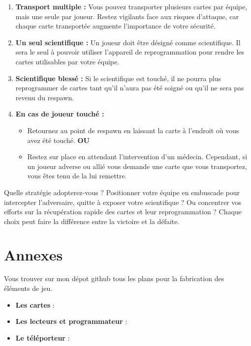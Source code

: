 \documentclass{template}
\begin{document}
\begin{enumerate}
    \item \textbf{Transport multiple :} Vous pouvez transporter plusieurs cartes par équipe, mais une seule par joueur. Restez vigilants face aux risques d’attaque, car chaque carte transportée augmente l’importance de votre sécurité.
    \item \textbf{Un seul scientifique :} Un joueur doit être désigné comme scientifique. Il sera le seul à pouvoir utiliser l’appareil de reprogrammation pour rendre les cartes utilisables par votre équipe.
    \item \textbf{Scientifique blessé :} Si le scientifique est touché, il ne pourra plus reprogrammer de cartes tant qu’il n’aura pas été soigné ou qu’il ne sera pas revenu du respawn.
    \item \textbf{En cas de joueur touché :}
    \begin{itemize}
        \item Retournez au point de respawn en laissant la carte à l’endroit où vous avez été touché.\newline
        \textbf{OU}
        \item Restez sur place en attendant l’intervention d’un médecin. Cependant, si un joueur adverse ou allié vous demande une carte que vous transportez, vous êtes tenu de la lui remettre.
    \end{itemize}
\end{enumerate}

Quelle stratégie adopterez-vous ? Positionner votre équipe en embuscade pour intercepter l’adversaire, quitte à exposer votre scientifique ? Ou concentrer vos efforts sur la récupération rapide des cartes et leur reprogrammation ? Chaque choix peut faire la différence entre la victoire et la défaite.

\section{Annexes}

Vous trouver sur mon dépot github tous les plans pour la fabrication des éléments de jeu.

\begin{itemize}
    \item \textbf{Les cartes} : 
    \item \textbf{Les lecteurs et programmateur} : 
    \item \textbf{Le téléporteur} : 
\end{itemize}
\end{document}
